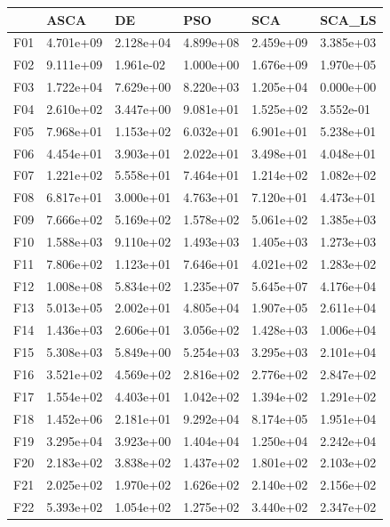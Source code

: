 \begin{tabular}{llllll}
\toprule
{} &       ASCA &         DE &        PSO &        SCA &     SCA\_LS \\
\midrule
F01  &  4.701e+09 &  2.128e+04 &  4.899e+08 &  2.459e+09 &  3.385e+03 \\
F02  &  9.111e+09 &  1.961e-02 &  1.000e+00 &  1.676e+09 &  1.970e+05 \\
F03  &  1.722e+04 &  7.629e+00 &  8.220e+03 &  1.205e+04 &  0.000e+00 \\
F04  &  2.610e+02 &  3.447e+00 &  9.081e+01 &  1.525e+02 &  3.552e-01 \\
F05  &  7.968e+01 &  1.153e+02 &  6.032e+01 &  6.901e+01 &  5.238e+01 \\
F06  &  4.454e+01 &  3.903e+01 &  2.022e+01 &  3.498e+01 &  4.048e+01 \\
F07  &  1.221e+02 &  5.558e+01 &  7.464e+01 &  1.214e+02 &  1.082e+02 \\
F08  &  6.817e+01 &  3.000e+01 &  4.763e+01 &  7.120e+01 &  4.473e+01 \\
F09  &  7.666e+02 &  5.169e+02 &  1.578e+02 &  5.061e+02 &  1.385e+03 \\
F10  &  1.588e+03 &  9.110e+02 &  1.493e+03 &  1.405e+03 &  1.273e+03 \\
F11  &  7.806e+02 &  1.123e+01 &  7.646e+01 &  4.021e+02 &  1.283e+02 \\
F12  &  1.008e+08 &  5.834e+02 &  1.235e+07 &  5.645e+07 &  4.176e+04 \\
F13  &  5.013e+05 &  2.002e+01 &  4.805e+04 &  1.907e+05 &  2.611e+04 \\
F14  &  1.436e+03 &  2.606e+01 &  3.056e+02 &  1.428e+03 &  1.006e+04 \\
F15  &  5.308e+03 &  5.849e+00 &  5.254e+03 &  3.295e+03 &  2.101e+04 \\
F16  &  3.521e+02 &  4.569e+02 &  2.816e+02 &  2.776e+02 &  2.847e+02 \\
F17  &  1.554e+02 &  4.403e+01 &  1.042e+02 &  1.394e+02 &  1.291e+02 \\
F18  &  1.452e+06 &  2.181e+01 &  9.292e+04 &  8.174e+05 &  1.951e+04 \\
F19  &  3.295e+04 &  3.923e+00 &  1.404e+04 &  1.250e+04 &  2.242e+04 \\
F20  &  2.183e+02 &  3.838e+02 &  1.437e+02 &  1.801e+02 &  2.103e+02 \\
F21  &  2.025e+02 &  1.970e+02 &  1.626e+02 &  2.140e+02 &  2.156e+02 \\
F22  &  5.393e+02 &  1.054e+02 &  1.275e+02 &  3.440e+02 &  2.347e+02 \\

\end{tabular}
